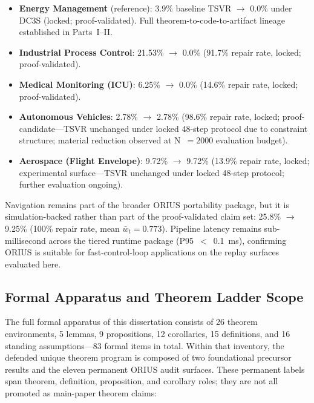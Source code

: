 \begin{itemize}
  \item \textbf{Energy Management} (reference): 3.9\% baseline TSVR $\rightarrow$
    0.0\% under DC3S (locked; proof-validated).  Full theorem-to-code-to-artifact
    lineage established in Parts~I--II.
  \item \textbf{Industrial Process Control}: 21.53\% $\rightarrow$ 0.0\%
    (91.7\% repair rate, locked; proof-validated).
  \item \textbf{Medical Monitoring (ICU)}: 6.25\% $\rightarrow$ 0.0\%
    (14.6\% repair rate, locked; proof-validated).
  \item \textbf{Autonomous Vehicles}: 2.78\% $\rightarrow$ 2.78\%
    (98.6\% repair rate, locked; proof-candidate---TSVR unchanged under
    locked 48-step protocol due to constraint structure; material reduction
    observed at N~$= 2000$ evaluation budget).
  \item \textbf{Aerospace (Flight Envelope)}: 9.72\% $\rightarrow$ 9.72\%
    (13.9\% repair rate, locked; experimental surface---TSVR unchanged
    under locked 48-step protocol; further evaluation ongoing).
\end{itemize}

Navigation remains part of the broader ORIUS portability package, but it is
simulation-backed rather than part of the proof-validated claim set:
25.8\% $\rightarrow$ 9.25\% (100\% repair rate, mean $\bar{w}_t = 0.773$).
Pipeline latency remains sub-millisecond across the tiered runtime package
(P95~$<$~0.1~ms), confirming ORIUS is suitable for fast-control-loop
applications on the replay surfaces evaluated here.

\subsection{Formal Apparatus and Theorem Ladder Scope}

The full formal apparatus of this dissertation consists of 26 theorem
environments, 5 lemmas, 9 propositions, 12 corollaries, 15 definitions, and
16 standing assumptions---83 formal items in total.  Within that inventory,
the defended unique theorem program is composed of two foundational precursor
results and the eleven permanent ORIUS audit surfaces.  These permanent labels
span theorem, definition, proposition, and corollary roles; they are not all
promoted as main-paper theorem claims:

